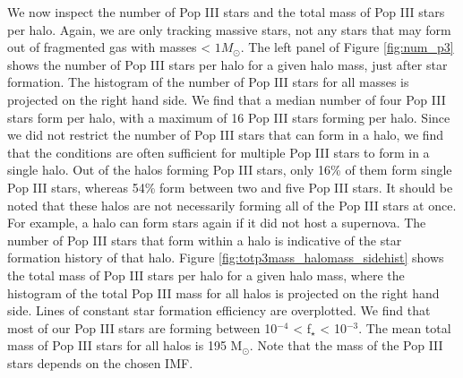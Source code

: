 \documentclass[a4paper,fleqn,usenatbib]{mnras}
\begin{document}
We now inspect the number of Pop III stars and the total mass of Pop III stars per halo. Again, we are only tracking massive stars, not any stars that may form out of fragmented gas with masses < $1 M_{\odot}$. The left panel of Figure \ref{fig:num_p3} shows the number of Pop III stars per halo for a given halo mass, just after star formation. The histogram of the number of Pop III stars for all masses is projected on the right hand side. We find that a median number of four Pop III stars form per halo, with a maximum of 16 Pop III stars forming per halo. Since we did not restrict the number of Pop III stars that can form in a halo, we find that the conditions are often sufficient for multiple Pop III stars to form in a single halo. Out of the halos forming Pop III stars, only 16\% of them form single Pop III stars, whereas 54\% form between two and five Pop III stars. It should be noted that these halos are not necessarily forming all of the Pop III stars at once. For example, a halo can form stars again if it did not host a supernova. The number of Pop III stars that form within a halo is indicative of the star formation history of that halo. Figure \ref{fig:totp3mass_halomass_sidehist} shows the total mass of Pop III stars per halo for a given halo mass, where the histogram of the total Pop III mass for all halos is projected on the right hand side. Lines of constant star formation efficiency are overplotted. We find that most of our Pop III stars are forming between 10$^{-4}$ < f$_\star$ < 10$^{-3}$. The mean total mass of Pop III stars for all halos is 195 M$_{\odot}$. Note that the mass of the Pop III stars depends on the chosen IMF. 
\end{document}
